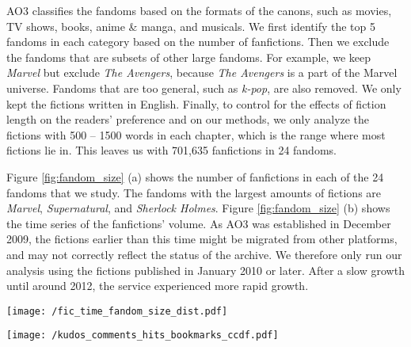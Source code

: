 \documentclass[letterpaper]{article} %
\begin{document}
AO3 classifies the fandoms based on the formats of the canons, such as movies, TV shows, books, anime \& manga, and musicals. We first identify the top 5 fandoms in each category based on the number of fanfictions. Then we exclude the fandoms that are subsets of other large fandoms. For example, we keep \emph{Marvel} but exclude \emph{The Avengers}, because \emph{The Avengers} is a part of the Marvel universe. Fandoms that are too general, such as \emph{k-pop}, are also removed. We only kept the fictions written in English. Finally, to control for the effects of fiction length on the readers' preference and on our methods, we only analyze the fictions with 500 -- 1500 words in each chapter, which is the range where most fictions lie in. This leaves us with 701,635 fanfictions in 24 fandoms. 

Figure \ref{fig:fandom_size} (a) shows the number of fanfictions in each of the 24 fandoms that we study. The fandoms with the largest amounts of fictions are \emph{Marvel}, \emph{Supernatural}, and \emph{Sherlock Holmes}. Figure \ref{fig:fandom_size} (b) shows the time series of the fanfictions' volume. As AO3 was established in December 2009, the fictions earlier than this time might be migrated from other platforms, and may not correctly reflect the status of the archive. We therefore only run our analysis using the fictions published in January 2010 or later. After a slow growth until around 2012, the service experienced more rapid growth. 

\begin{figure*}
    \centering
        \texttt{[image: /fic\_time\_fandom\_size\_dist.pdf]}
        \caption{The size of fandoms and the number of fanfictions published in time.}
        \label{fig:fandom_size}    
    \end{figure*}
    
\begin{figure*}
    \centering
       \texttt{[image: /kudos\_comments\_hits\_bookmarks\_ccdf.pdf]}
        \caption{Log-log complementary cumulative distribution of kudos, hits, bookmarks and comments. For multi-chapter fanfictions, we average these values over the number of chapters. Fat-tailed distributions are observed, where a small portion of fictions receive many kudos and comments, and most fictions receive few.}
        \label{fig:kudos_dist}
    \end{figure*}
\end{document}
